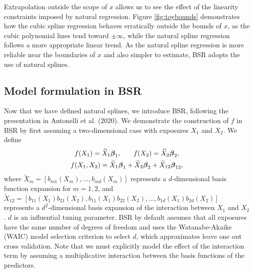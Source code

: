 \documentclass[12pt, twoside]{amherstthesis}
\begin{document}
Extrapolation outside the scope of \(x\) allows us to see the effect of the linearity constraints imposed by natural regression. Figure \ref{fig:toybounds} demonstrates how the cubic spline regression behaves erratically outside the bounds of \(x\), as the cubic polynomial lines tend toward \(\pm\infty\), while the natural spline regression follows a more appropriate linear trend. As the natural spline regression is more reliable near the boundaries of \(x\) and also simpler to estimate, BSR adopts the use of natural splines.

\hypertarget{model-formulation-in-bsr}{%
\subsection{Model formulation in BSR}\label{model-formulation-in-bsr}}

Now that we have defined natural splines, we introduce BSR, following the presentation in Antonelli et al. (2020). We demonstrate the construction of \(f\) in BSR by first assuming a two-dimensional case with exposures \(X_1\) and \(X_2\). We define
\begin{gather*}
f(X_1) = \widetilde{X}_1\boldsymbol{\beta}_1, \hspace{0.25in} f(X_2) = \widetilde{X}_2\boldsymbol{\beta}_2,\\
f(X_1,X_2) = \widetilde{X}_1\boldsymbol{\beta}_1 + \widetilde{X}_2\boldsymbol{\beta}_2 + \widetilde{X}_{12}\boldsymbol{\beta}_{12},
\end{gather*}
\noindent where \(\widetilde{X}_m=[b_{m1}(X_m),\dots,b_{md}(X_m)]\) represents a \(d\)-dimensional basis function expansion for \(m=1,2\), and \(\widetilde{X}_{12}= [b_{11}(X_1)b_{21}(X_2), b_{11}(X_1)b_{22}(X_2), \dots, b_{1d}(X_1)b_{2d}(X_2)]\) represents a \(d^2\)-dimensional basis expansion of the interaction between \(X_1\) and \(X_2\). \(d\) is an influential tuning parameter. BSR by default assumes that all exposures have the same number of degrees of freedom and uses the Watanabe-Akaike (WAIC) model selection criterion to select \(d\), which approximates leave one out cross validation. Note that we must explicitly model the effect of the interaction term by assuming a multiplicative interaction between the basis functions of the predictors.
\end{document}
